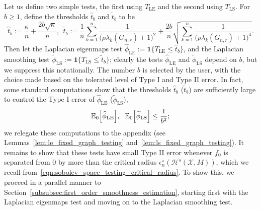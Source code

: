 \documentclass{article}
\newcommand{\1}{\mathbf{1}}
\newcommand{\Xset}{\mathcal{X}}
\newcommand{\mc}[1]{\mathcal{#1}}
\newcommand{\Ebb}{\mathbb{E}}
\newcommand{\wt}[1]{\widetilde{#1}}
\newcommand{\wh}[1]{\widehat{#1}}
\newcommand{\LE}{\mathrm{LE}}
\newcommand{\LS}{\mathrm{LS}}
\theoremstyle{alden}
\theoremstyle{aldenthm}
\theoremstyle{definition}
\theoremstyle{remark}
\begin{document}
Let us define two simple tests, the first using $T_{\LE}$ and the second using $T_{\LS}$. For $b \geq 1$, define the thresholds $\wh{t}_b$ and $\wt{t}_b$ to be
\begin{equation*}
\wh{t}_{b} := \frac{\kappa}{n} + \frac{2b\sqrt{\kappa}}{n},~~ \wt{t}_{b} := \frac{1}{n}\sum_{k = 1}^{n} \frac{1}{\bigl(\rho \lambda_k(G_{n,r}) + 1\bigr)^2} + \frac{2b}{n}\sqrt{\sum_{k = 1}^{n} \frac{1}{\bigl(\rho \lambda_k(G_{n,r}) + 1\bigr)^4}}.
\end{equation*}
Then let the Laplacian eigenmaps test $\wh{\phi}_{\LE} := \1\bigl\{T_{\LE} \leq \wh{t}_b\bigr\}$, and the Laplacian smoothing test $\wt{\phi}_{\LS} := \1\bigl\{T_{\LS} \leq \wt{t}_b\bigr\}$; clearly the tests $\wh{\phi}_{\LE}$ and $\wt{\phi}_{\LS}$ depend on $b$, but we suppress this notationally. The number $b$ is selected by the user, with the choice made based on the tolerated level of Type I and Type II error. In fact, some standard computations show that the thresholds $\wh{t}_b$ ($\wt{t}_b$) are sufficiently large to control the Type I error of $\wh{\phi}_{\LE}$ ($\wt{\phi}_{\LS}$), 
\begin{equation*}
\Ebb_0\Bigl[\wh{\phi}_{\LE}\Bigr],~~\Ebb_0\Bigl[\wt{\phi}_{\LS}\Bigr] \leq \frac{1}{b^2};
\end{equation*}
we relegate these computations to the appendix (see Lemmas~\ref{lem:le_fixed_graph_testing} and~\ref{lem:ls_fixed_graph_testing}). It remains to show that these tests have small Type II error whenever $f_0$ is separated from $0$ by more than the critical radius $\epsilon_n^{\star}(\mc{H}^s(\Xset,M))$, which we recall from~\eqref{eqn:sobolev_space_testing_critical_radius}. To show this, we proceed in a parallel manner to Section~\ref{subsubsec:first_order_smoothness_estimation}, starting first with the Laplacian eigenmaps test and moving on to the Laplacian smoothing test. 
\end{document}
